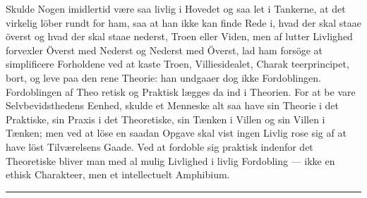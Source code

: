 \documentclass[12pt,a4paper]{article}
\newcommand{\opage}[1]{\marginnote{\footnotesize\textit{[#1]}}}
\begin{document}
Skulde Nogen imidlertid være saa livlig i Hovedet
og saa let i Tankerne, at det virkelig löber rundt for ham,
saa at han ikke kan finde Rede i, hvad der skal staae
överst og hvad der skal staae nederst, Troen eller Viden,
men af lutter Livlighed forvexler Överst med Nederst
og Nederst med Överst, lad ham forsöge at simplificere
Forholdene ved at kaste Troen, Villiesidealet, Charak\-%
teerprincipet, bort, og leve paa den rene Theorie: han
undgaaer dog ikke Fordoblingen. Fordoblingen af Theo\-%
retisk og Praktisk lægges da ind i Theorien. For at be\-%
vare Selvbevidsthedens Eenhed, skulde et Menneske alt\-%
\opage{77}saa have sin Theorie i det Praktiske, sin Praxis i det
Theoretiske, sin Tænken i Villen og sin Villen i Tænken;
men ved at löse en saadan Opgave skal vist ingen Livlig
rose sig af at have löst Tilværelsens Gaade. Ved at
fordoble sig praktisk indenfor det Theoretiske bliver man
med al mulig Livlighed i livlig Fordobling --- ikke en
ethisk Charakteer, men et intellectuelt Amphibium.

\begin{center}\rule{0.2\linewidth}{0.4pt}\end{center}
\end{document}
